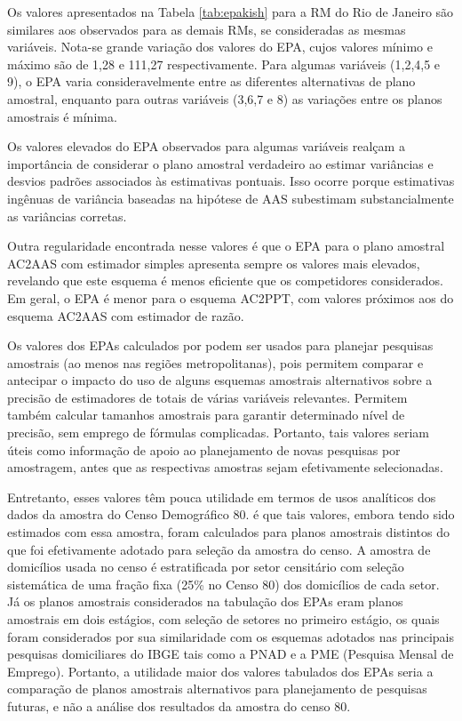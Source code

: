 \documentclass[]{book}
\theoremstyle{definition}
\theoremstyle{definition}
\theoremstyle{definition}
\theoremstyle{remark}
\begin{document}
Os valores apresentados na Tabela \ref{tab:epakish} para a RM do Rio de
Janeiro são similares aos observados para as demais RMs, se consideradas
as mesmas variáveis. Nota-se grande variação dos valores do EPA, cujos
valores mínimo e máximo são de 1,28 e 111,27 respectivamente. Para
algumas variáveis (1,2,4,5 e 9), o EPA varia consideravelmente entre as
diferentes alternativas de plano amostral, enquanto para outras
variáveis (3,6,7 e 8) as variações entre os planos amostrais é mínima.

Os valores elevados do EPA observados para algumas variáveis realçam a
importância de considerar o plano amostral verdadeiro ao estimar
variâncias e desvios padrões associados às estimativas pontuais. Isso
ocorre porque estimativas ingênuas de variância baseadas na hipótese de
AAS subestimam substancialmente as variâncias corretas.

Outra regularidade encontrada nesse valores é que o EPA para o plano
amostral AC2AAS com estimador simples apresenta sempre os valores mais
elevados, revelando que este esquema é menos eficiente que os
competidores considerados. Em geral, o EPA é menor para o esquema
AC2PPT, com valores próximos aos do esquema AC2AAS com estimador de
razão.

Os valores dos EPAs calculados por \citep{SilvaMou} podem ser usados
para planejar pesquisas amostrais (ao menos nas regiões metropolitanas),
pois permitem comparar e antecipar o impacto do uso de alguns esquemas
amostrais alternativos sobre a precisão de estimadores de totais de
várias variáveis relevantes. Permitem também calcular tamanhos amostrais
para garantir determinado nível de precisão, sem emprego de fórmulas
complicadas. Portanto, tais valores seriam úteis como informação de
apoio ao planejamento de novas pesquisas por amostragem, antes que as
respectivas amostras sejam efetivamente selecionadas.

Entretanto, esses valores têm pouca utilidade em termos de usos
analíticos dos dados da amostra do Censo Demográfico 80. é que tais
valores, embora tendo sido estimados com essa amostra, foram calculados
para planos amostrais distintos do que foi efetivamente adotado para
seleção da amostra do censo. A amostra de domicílios usada no censo é
estratificada por setor censitário com seleção sistemática de uma fração
fixa (25\% no Censo 80) dos domicílios de cada setor. Já os planos
amostrais considerados na tabulação dos EPAs eram planos amostrais em
dois estágios, com seleção de setores no primeiro estágio, os quais
foram considerados por sua similaridade com os esquemas adotados nas
principais pesquisas domiciliares do IBGE tais como a PNAD e a PME
(Pesquisa Mensal de Emprego). Portanto, a utilidade maior dos valores
tabulados dos EPAs seria a comparação de planos amostrais alternativos
para planejamento de pesquisas futuras, e não a análise dos resultados
da amostra do censo 80.
\end{document}
